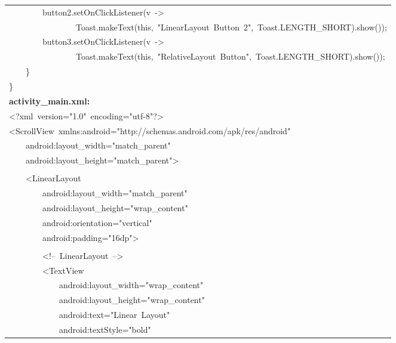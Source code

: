 \documentclass[a4paper,12pt]{article}
\begin{document}
\begin{longtable}{|p{}|}
{\ttfamily\small \ \ \ \ \ \ \ \ button2.setOnClickListener(v\ -\textgreater{}} \\
{\ttfamily\small \ \ \ \ \ \ \ \ \ \ \ \ \ \ \ \ Toast.makeText(this,\ "LinearLayout\ Button\ 2",\ Toast.LENGTH\_SHORT).show());} \\
{\ttfamily\small \ \ \ \ \ \ \ \ button3.setOnClickListener(v\ -\textgreater{}} \\
{\ttfamily\small \ \ \ \ \ \ \ \ \ \ \ \ \ \ \ \ Toast.makeText(this,\ "RelativeLayout\ Button",\ Toast.LENGTH\_SHORT).show());} \\
{\ttfamily\small \ \ \ \ \}} \\
{\ttfamily\small \}} \\
\hline
\rule{0pt}{13pt}\textbf{activity\_main.xml:} \\
\hline
{\ttfamily\small \textless{}?xml\ version="1.0"\ encoding="utf-8"?\textgreater{}} \\
{\ttfamily\small \textless{}ScrollView\ xmlns:android="http://schemas.android.com/apk/res/android"} \\
{\ttfamily\small \ \ \ \ android:layout\_width="match\_parent"} \\
{\ttfamily\small \ \ \ \ android:layout\_height="match\_parent"\textgreater{}} \\
\strut \\
{\ttfamily\small \ \ \ \ \textless{}LinearLayout} \\
{\ttfamily\small \ \ \ \ \ \ \ \ android:layout\_width="match\_parent"} \\
{\ttfamily\small \ \ \ \ \ \ \ \ android:layout\_height="wrap\_content"} \\
{\ttfamily\small \ \ \ \ \ \ \ \ android:orientation="vertical"} \\
{\ttfamily\small \ \ \ \ \ \ \ \ android:padding="16dp"\textgreater{}} \\
\strut \\
{\ttfamily\small \ \ \ \ \ \ \ \ \textless{}!--\ LinearLayout\ --\textgreater{}} \\
{\ttfamily\small \ \ \ \ \ \ \ \ \textless{}TextView} \\
{\ttfamily\small \ \ \ \ \ \ \ \ \ \ \ \ android:layout\_width="wrap\_content"} \\
{\ttfamily\small \ \ \ \ \ \ \ \ \ \ \ \ android:layout\_height="wrap\_content"} \\
{\ttfamily\small \ \ \ \ \ \ \ \ \ \ \ \ android:text="Linear\ Layout"} \\
{\ttfamily\small \ \ \ \ \ \ \ \ \ \ \ \ android:textStyle="bold"} \\

\end{longtable}
\end{document}
